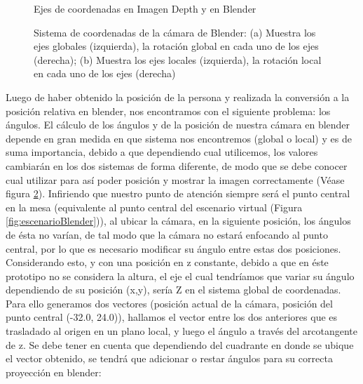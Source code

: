 \documentclass[a4paper,openright,12pt]{report}
\begin{document}
\begin{figure}[htb]
	\centering
	\hspace*{-1.5cm}
	\caption{Ejes de coordenadas en Imagen Depth y en Blender } \label{fig:coords}
\end{figure}
\begin{figure}[thb]
	\centering
	\caption[Sistema de coordenadas de la cámara de Blender]{Sistema de coordenadas de la cámara de Blender: (a) Muestra los ejes globales (izquierda), la rotación global en cada uno de los ejes (derecha); (b) Muestra los ejes locales (izquierda), la rotación local en cada uno de los ejes (derecha) } \label{fig:camaraBlender}
\end{figure}
Luego de haber obtenido la posición de la persona y realizada la conversión a la posición relativa en blender, nos encontramos con el siguiente problema: los ángulos. El cálculo de los ángulos y de la posición de nuestra cámara en blender depende en gran medida en que sistema nos encontremos (global o local) y es de suma importancia, debido a que dependiendo cual utilicemos, los valores cambiarán en los dos sistemas de forma diferente, de modo que se debe conocer cual utilizar para así poder posición y mostrar la imagen correctamente (Véase figura \ref{fig:camaraBlender}). Infiriendo que nuestro punto de atención siempre será el punto central en la mesa (equivalente al punto central del escenario virtual (Figura \ref{fig:escenarioBlender})), al ubicar la cámara, en la siguiente posición, los ángulos de ésta no varían, de tal modo que la cámara no estará enfocando al punto central, por lo que es necesario modificar su ángulo entre estas dos posiciones. Considerando esto, y con una posición en z constante, debido a que en éste prototipo no se considera la altura, el eje el cual tendríamos que variar su ángulo dependiendo de su posición (x,y), sería Z en el sistema global de coordenadas. Para ello generamos dos vectores (posición actual de la cámara, posición del punto central (-32.0, 24.0)), hallamos el vector entre los dos anteriores que es trasladado al origen en un plano local, y luego el ángulo a través del arcotangente de z. Se debe tener en cuenta que dependiendo del cuadrante en donde se ubique el vector obtenido, se tendrá que adicionar o restar ángulos para su correcta proyección en blender:
\end{document}
